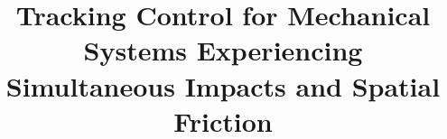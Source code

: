 \newcommand{\mytitle}{Tracking Control for Mechanical Systems Experiencing Simultaneous Impacts and Spatial Friction}
\title{\mytitle}






\pagestyle{plain} %




\pagestyle{plain}
\tableofcontents








\cleartooddpage
\pagestyle{plain}







